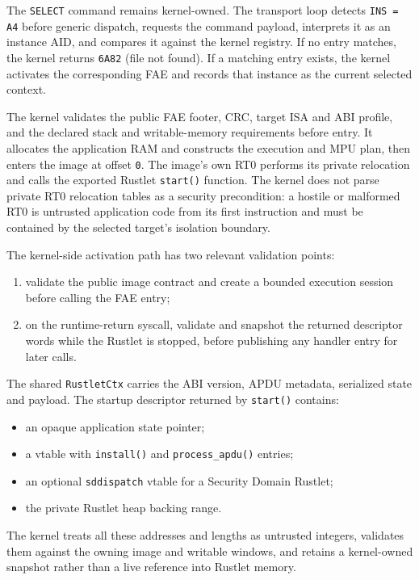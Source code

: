 The \texttt{SELECT} command remains kernel-owned. The transport loop
detects \texttt{INS = A4} before generic dispatch, requests the command
payload, interprets it as an instance AID, and compares it against the
kernel registry. If no entry matches, the kernel returns \texttt{6A82}
(file not found). If a matching entry exists, the kernel activates the
corresponding FAE and records that instance as the current
selected context.

The kernel validates the public FAE footer, CRC, target ISA and ABI profile,
and the declared stack and writable-memory requirements before entry. It
allocates the application RAM and constructs the execution and MPU plan, then
enters the image at offset \texttt{0}. The image's own RT0 performs its
private relocation and calls the exported Rustlet \texttt{start()} function.
The kernel does not parse private RT0 relocation tables as a security
precondition: a hostile or malformed RT0 is untrusted application code from
its first instruction and must be contained by the selected target's
isolation boundary.

The kernel-side activation path has two relevant validation points:
\begin{enumerate}
\item validate the public image contract and create a bounded execution
  session before calling the FAE entry;
\item on the runtime-return syscall, validate and snapshot the returned
  descriptor words while the Rustlet is stopped, before publishing any
  handler entry for later calls.
\end{enumerate}

The shared \texttt{RustletCtx} carries the ABI version, APDU metadata,
serialized state and payload. The startup descriptor returned by
\texttt{start()} contains:
\begin{itemize}
\item an opaque application state pointer;
\item a vtable with \texttt{install()} and \texttt{process\_apdu()} entries;
\item an optional \texttt{sddispatch} vtable for a Security Domain Rustlet;
\item the private Rustlet heap backing range.
\end{itemize}
The kernel treats all these addresses and lengths as untrusted integers,
validates them against the owning image and writable windows, and retains a
kernel-owned snapshot rather than a live reference into Rustlet memory.

